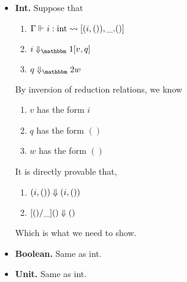 \documentclass{article}
\begin{document}
\begin{itemize}
\item {\bf Int.} Suppose that
\begin{enumerate}
\item ${\Gamma} \Vdash {i}:{\rm int} \rightsquigarrow \left[{(i,()),\_.()}\right]$
\item $\rsone{i}{v}{q}$
\item $\reducetwo{q}{w}$
\end{enumerate}
By inversion of reduction relations, we know
\begin{enumerate}
\item $v$ has the form $i$
\item $q$ has the form $()$
\item $w$ has the form $()$
\end{enumerate}
It is directly provable that,
\begin{enumerate}
\item ${(i,())} \Downarrow {({i},{()})}$
\item ${[()/\_]()} \Downarrow {()}$
\end{enumerate}
Which is what we need to show.

\item {\bf Boolean.} Same as int.
\item {\bf Unit.} Same as int.


\end{itemize}
\end{document}
